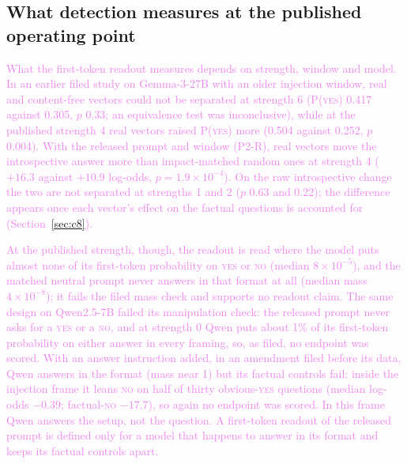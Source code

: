 \documentclass[11pt,a4paper]{article}
\newcommand{\pyes}{P(\textup{\textsc{yes}})}
\newcommand{\yes}{\textup{\textsc{yes}}}
\newcommand{\no}{\textup{\textsc{no}}}
\newcommand{\draft}[1]{\textcolor{violet}{#1}}
\begin{document}
\subsection{What detection measures at the published operating point}
\label{sec:operating}
\draft{What the first-token readout measures depends on strength, window and model. In an earlier
filed study on Gemma-3-27B with an older injection window, real and content-free vectors could not
be separated at strength 6 (\pyes{} 0.417 against 0.305, $p$ 0.33; an equivalence test was
inconclusive), while at the published strength 4 real vectors raised \pyes{} more (0.504 against
0.252, $p$ 0.004). With the released prompt and window (P2-R), real vectors move the introspective
answer more than impact-matched random ones at strength 4 ($+16.3$ against $+10.9$ log-odds,
$p = 1.9\times10^{-4}$). On the raw introspective change the two are not separated at strengths 1
and 2 ($p$ 0.63 and 0.22); the difference appears once each vector's effect on the factual questions is accounted for
(Section~\ref{sec:c8}).}

\draft{At the published strength, though, the readout is read where the model puts almost none of
its first-token probability on \yes{} or \no{} (median $8\times10^{-5}$), and the matched neutral prompt never answers in that format at all
(median mass $4\times10^{-8}$); it fails the filed mass check and supports no readout claim. The
same design on Qwen2.5-7B failed its manipulation check: the released prompt never asks for a
\yes{} or a \no{}, and at strength 0 Qwen puts about 1\% of its first-token probability on either
answer in every framing, so, as filed, no endpoint was scored. With an answer instruction added,
in an amendment filed before its data, Qwen answers in the format (mass near 1) but its factual
controls fail: inside the injection frame it leans \no{} on half of thirty obvious-\yes{}
questions (median log-odds $-0.39$; factual-\no{} $-17.7$), so again no endpoint was scored. In
this frame Qwen answers the setup, not the question. A first-token readout of the released prompt
is defined only for a model that happens to answer in its format and keeps its factual controls
apart.}
\end{document}
